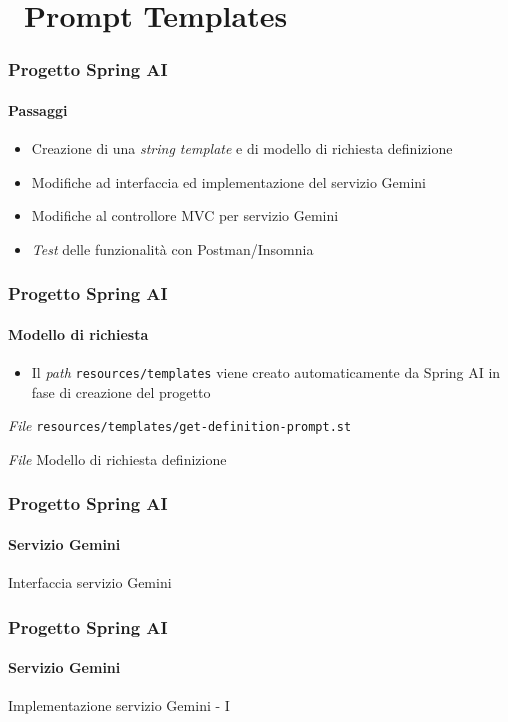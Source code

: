 \section{\faWrench\ Prompt Templates} %
\label{sec:spring-ai-gemini-prompt-templates}
%
\begin{frame}[t,fragile] \frametitle{Progetto Spring AI}
    \framesubtitle{Passaggi}
	\begin{itemize}[leftmargin=10pt,align=right]
		\item[\alertedcircled{1}] Creazione di una \textit{string template} e di modello di richiesta definizione
        \item[\alertedcircled{2}] Modifiche ad interfaccia ed implementazione del servizio Gemini
        \item[\alertedcircled{3}] Modifiche al controllore MVC per servizio Gemini
        \item[\alertedcircled{4}] \textit{Test} delle funzionalità con Postman/Insomnia 
	\end{itemize}        
\end{frame}
%
\begin{frame}[t,fragile] \frametitle{Progetto Spring AI}
    \framesubtitle{Modello di richiesta}
        \begin{itemize}[leftmargin=10pt,align=right]
		    \item[\alert{\faExclamationTriangle}] Il \textit{path} \texttt{resources/templates} viene creato automaticamente da Spring AI in fase di creazione del progetto
        \end{itemize}
        \begin{block}{\textit{File} \texttt{resources/templates/get-definition-prompt.st}}
			{\scriptsize}
    	\end{block}
        \begin{block}{\textit{File} Modello di richiesta definizione}
			{\scriptsize}
    	\end{block}
\end{frame}
%
\begin{frame}[t,fragile] \frametitle{Progetto Spring AI}
    \framesubtitle{Servizio Gemini}
        \begin{block}{Interfaccia servizio Gemini}
{\tiny}
    \end{block}
\end{frame}
%
\begin{frame}[t,fragile] \frametitle{Progetto Spring AI}
    \framesubtitle{Servizio Gemini}
		\vspace*{-.7cm}
        \begin{block}{Implementazione servizio Gemini - I}
            {\tiny}
    \end{block}
\end{frame}

